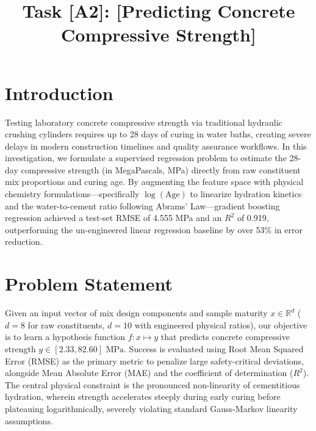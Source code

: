 \documentclass[conference]{IEEEtran}
\begin{document}
\title{Task [A2]: [Predicting Concrete Compressive Strength]}

\author{
}

\maketitle

\section{Introduction}
Testing laboratory concrete compressive strength via traditional hydraulic crushing cylinders requires up to 28 days of curing in water baths, creating severe delays in modern construction timelines and quality assurance workflows. In this investigation, we formulate a supervised regression problem to estimate the 28-day compressive strength (in MegaPascals, MPa) directly from raw constituent mix proportions and curing age. By augmenting the feature space with physical chemistry formulations---specifically $\log(\text{Age})$ to linearize hydration kinetics and the water-to-cement ratio following Abrams' Law---gradient boosting regression achieved a test-set RMSE of 4.555 MPa and an $R^2$ of 0.919, outperforming the un-engineered linear regression baseline by over 53\% in error reduction.

\section{Problem Statement}
Given an input vector of mix design components and sample maturity $x \in \mathbb{R}^d$ ($d=8$ for raw constituents, $d=10$ with engineered physical ratios), our objective is to learn a hypothesis function $f: x \mapsto y$ that predicts concrete compressive strength $y \in [2.33, 82.60]\text{ MPa}$. Success is evaluated using Root Mean Squared Error (RMSE) as the primary metric to penalize large safety-critical deviations, alongside Mean Absolute Error (MAE) and the coefficient of determination ($R^2$). The central physical constraint is the pronounced non-linearity of cementitious hydration, wherein strength accelerates steeply during early curing before plateauing logarithmically, severely violating standard Gauss-Markov linearity assumptions.
\end{document}
